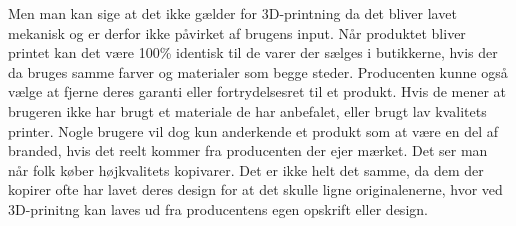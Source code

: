 Men man kan sige at det ikke gælder for 3D-printning da det bliver lavet mekanisk og er derfor ikke påvirket af brugens input. Når produktet bliver printet kan det være 100\% identisk til de varer der sælges i butikkerne, hvis der da bruges samme farver og materialer som begge steder. 
Producenten kunne også vælge at fjerne deres garanti eller fortrydelsesret til et produkt. Hvis de mener at brugeren ikke har brugt et materiale de har anbefalet, eller brugt lav kvalitets printer. 
Nogle brugere vil dog kun anderkende et produkt som at være en del af branded, hvis det reelt kommer fra producenten der ejer mærket. Det ser man når folk køber højkvalitets kopivarer. Det er ikke helt det samme, da dem der kopirer ofte har lavet deres design for at det skulle ligne originalenerne, hvor ved 3D-prinitng kan laves ud fra producentens egen opskrift eller design.


